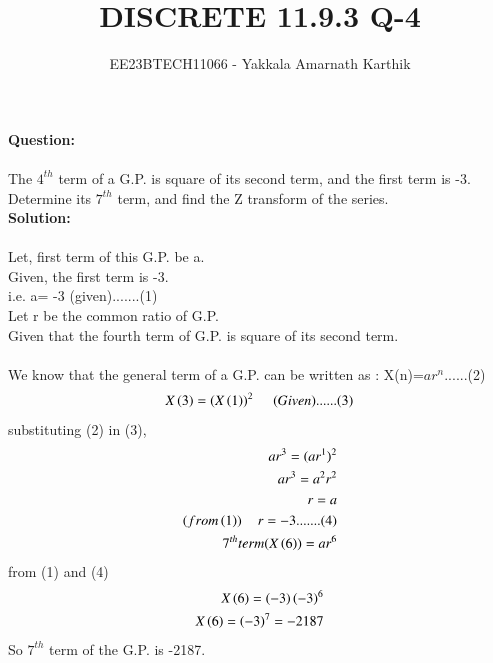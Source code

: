\documentclass[journal,12pt,twocolumn]{IEEEtran}
\begin{document}


\title{DISCRETE 11.9.3 Q-4}
\author{EE23BTECH11066 - Yakkala Amarnath Karthik
}
\maketitle


\textbf{Question:} \\ \\The $4^{th}$ term of a G.P. is square of its second term, and the first term is -3. Determine its $7^{th}$ term, and find the Z transform of the series.\\

\textbf{Solution:} \\ \\
Let, first term of this G.P. be a.
\\Given, the first term is -3.\\ i.e. a= -3 (given).......(1) \\ 
Let r be the common ratio of G.P.\\
Given that the fourth term of G.P. is square of its second term.\\
\\We know that the general term of a G.P. can be written as : X(n)=$ar^{n}$......(2)
\begin{align}
 X\left(3\right)=(X\left(1\right))^2\hspace{0.5cm}(Given)......(3) 
 \end{align}
 \hspace{3cm} substituting (2) in (3),
 \begin{align}
 ar^{3}=(ar^{1})^2\\
ar^3=a^2r^2\\
r=a\\
(from\left(1\right))\hspace{0.4cm}r=-3.......(4)\\
\text7^{th} term(X\left(6\right))=ar^{6}
\end{align}
\hspace{3cm} from (1) and (4)
\begin{align}
X\left(6\right)=\left(-3\right)\left(-3\right)^6\\
X\left(6\right)=\left(-3\right)^7=-2187
\end{align}
So $7^{th}$ term of the G.P. is -2187.\\
\bigskip
\\ \\ \\ \\ \\ \\ \\ \\ \\ \\ 
  
\end{document}
